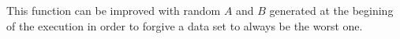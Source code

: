 \documentclass[a4paper, 12pts]{article}
\begin{document}
	This function can be improved with random $A$ and $B$ generated at the begining of the execution in order to forgive a data set to always be the worst one.


\end{document}

